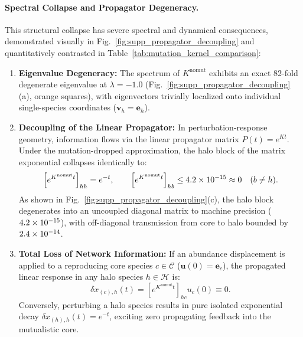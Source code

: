 \documentclass[11pt,a4paper]{article}
\begin{document}
\paragraph*{Spectral Collapse and Propagator Degeneracy.}
This structural collapse has severe spectral and dynamical consequences, demonstrated visually in Fig.~\ref{fig:supp_propagator_decoupling} and quantitatively contrasted in Table~\ref{tab:mutation_kernel_comparison}:
\begin{enumerate}
\item \textbf{Eigenvalue Degeneracy:} The spectrum of $K^{\mathrm{nomut}}$ exhibits an exact 82-fold degenerate eigenvalue at $\lambda = -1.0$ (Fig.~\ref{fig:supp_propagator_decoupling}(a), orange squares), with eigenvectors trivially localized onto individual single-species coordinates ($\mathbf{v}_h = \mathbf{e}_h$).
\item \textbf{Decoupling of the Linear Propagator:} In perturbation-response geometry, information flows via the linear propagator matrix $P(t) = e^{Kt}$. Under the mutation-dropped approximation, the halo block of the matrix exponential collapses identically to:
\begin{equation}
\left[ e^{K^{\mathrm{nomut}} t} \right]_{hh} = e^{-t}, \qquad \left[ e^{K^{\mathrm{nomut}} t} \right]_{hb} \le 4.2\times10^{-15} \approx 0 \quad (b \neq h).
\end{equation}
As shown in Fig.~\ref{fig:supp_propagator_decoupling}(c), the halo block degenerates into an uncoupled diagonal matrix to machine precision ($4.2\times10^{-15}$), with off-diagonal transmission from core to halo bounded by $2.4\times10^{-14}$.
\item \textbf{Total Loss of Network Information:} If an abundance displacement is applied to a reproducing core species $c \in \mathcal{C}$ ($\mathbf{u}(0) = \mathbf{e}_c$), the propagated linear response in any halo species $h \in \mathcal{H}$ is:
\begin{equation}
\delta x_{(c), h}(t) = \left[ e^{K^{\mathrm{nomut}} t} \right]_{hc} u_c(0) \equiv 0.
\end{equation}
Conversely, perturbing a halo species results in pure isolated exponential decay $\delta x_{(h), h}(t) = e^{-t}$, exciting zero propagating feedback into the mutualistic core.
\end{enumerate}
\end{document}
